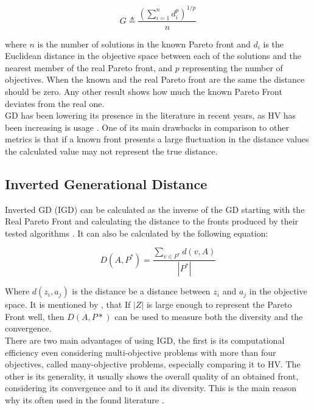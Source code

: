 \begin{equation}
G \triangleq \frac{\left(\sum_{i=1}^{n} d_{i}^{p}\right)^{1 / p}}{n}
\label{eq:generational_distance}
\end{equation}

where $n$ is the number of solutions in the known Pareto front and $d_i$ is the Euclidean distance in the objective space between each of the solutions and the nearest member of the real Pareto front, and $p$ representing the number of objectives. When the known and the real Pareto front are the same the distance should be zero. Any other result shows how much the known Pareto Front deviates from the real one. \\

GD has been lowering its presence in the literature in recent years, as HV has been increasing is usage \cite{riquelme2015performance}. One of its main drawbacks in comparison to other metrics is that if a known front presents a large fluctuation in the distance values the calculated value may not represent the true distance.

\subsection{Inverted Generational Distance}

Inverted GD (IGD) \cite{coello2004study} can be calculated as the inverse of the GD starting with the Real Pareto Front and calculating the distance to the fronts produced by their tested algorithms \cite{ishibuchi2015study}. It can also be calculated by the following equation:

\begin{equation}
D\left(A, P^{*}\right)=\frac{\sum_{v \in P^{*}} d(v, A)}{\left|P^{*}\right|}
\end{equation}

Where $d(z_i,a_j)$ is the distance be a distance between $z_i$ and $a_j$ in the objective space. It is mentioned by \cite{zhang2007moea}, that If $|Z|$ is large enough to represent the Pareto Front well, then $D(A, P*)$ can be used to measure both the diversity and the convergence.\\

There are two main advantages of using IGD, the first is its computational efficiency even considering multi-objective problems with more than four objectives, called many-objective problems, especially comparing it to HV. The other is its generality, it usually shows the overall quality of an obtained front, considering its convergence and to it and its diversity. This is the main reason why its often used in the found literature \cite{7007204}.\\

